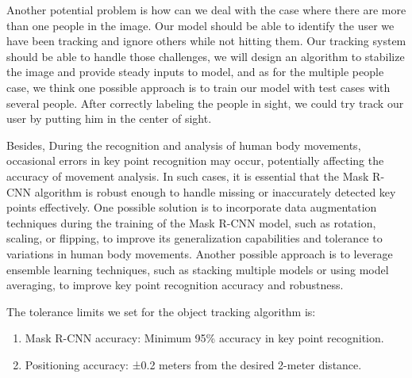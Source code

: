 Another potential problem is how can we deal with the case where there are more than one people in the image. Our model should be able to identify the user we have been tracking and ignore others while not hitting them. Our tracking system should be able to handle those challenges, we will design an algorithm to stabilize the image and provide steady inputs to model, and as for the multiple people case, we think one possible approach is to train our model with test cases with several people. After correctly labeling the people in sight, we could try track our user by putting him in the center of sight.

Besides, During the recognition and analysis of human body movements, occasional errors in key point recognition may occur, potentially affecting the accuracy of movement analysis. In such cases, it is essential that the Mask R-CNN algorithm is robust enough to handle missing or inaccurately detected key points effectively. One possible solution is to incorporate data augmentation techniques during the training of the Mask R-CNN model, such as rotation, scaling, or flipping, to improve its generalization capabilities and tolerance to variations in human body movements. Another possible approach is to leverage ensemble learning techniques, such as stacking multiple models or using model averaging, to improve key point recognition accuracy and robustness. 

The tolerance limits we set for the object tracking algorithm is:
\begin{enumerate}
    \item Mask R-CNN accuracy: Minimum 95\% accuracy in key point recognition.
    \item Positioning accuracy: ±0.2 meters from the desired 2-meter distance.
\end{enumerate}

\newpage